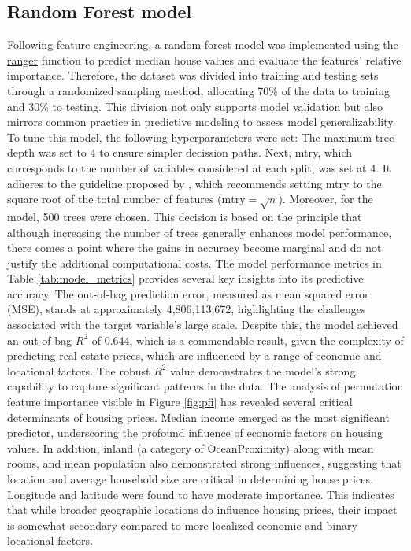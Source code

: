 \documentclass[12pt]{article}
\begin{document}
\subsection{Random Forest model }
Following feature engineering, a random forest model was implemented using the  \href{https://www.rdocumentation.org/packages/ranger/versions/0.16.0/topics/ranger}{ranger} function to predict median house values and evaluate the features' relative importance. 
Therefore, the dataset was divided into training and testing sets through a randomized sampling method, allocating 70\% of the data to training and 30\% to testing. This division not only supports model validation but also mirrors common practice in predictive modeling to assess model generalizability.
To tune this model, the following hyperparameters were set:
The maximum tree depth was set to 4 to ensure simpler decission paths.
Next, mtry, which corresponds to the number of variables considered at each split, was set at 4. It adheres to the guideline proposed by \citet{article}, which recommends setting mtry to the square root of the total number of features ($\text{mtry}=\sqrt{n}$).
Moreover, for the model, 500 trees were chosen. This decision is based on the principle that although increasing the number of trees generally enhances model performance, there comes a point where the gains in accuracy become marginal and do not justify the additional computational costs.
The model performance metrics in Table \ref{tab:model_metrics} provides several key insights into its predictive accuracy.
The out-of-bag prediction error, measured as mean squared error (MSE), stands at approximately 4,806,113,672, highlighting the challenges associated with the target variable's large scale.
Despite this, the model achieved an out-of-bag $R^2$ of 0.644, which is a commendable result, given the complexity of predicting real estate prices, which are influenced by a range of economic and locational factors. The robust $R^2$ value demonstrates the model's strong capability to capture significant patterns in the data.
The analysis of permutation feature importance visible in Figure \ref{fig:pfi} has revealed several critical determinants of housing prices.
Median income emerged as the most significant predictor, underscoring the profound influence of economic factors on housing values.
In addition, inland (a category of OceanProximity) along with mean rooms, and mean population also demonstrated strong influences, suggesting that location and average household size are critical in determining house prices. 
Longitude and latitude were found to have moderate importance. This indicates that while broader geographic locations do influence housing prices, their impact is somewhat secondary compared to more localized economic and binary locational factors.
\end{document}
